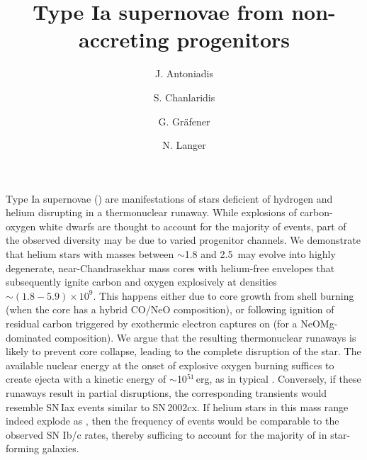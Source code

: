 \documentclass[twocolumn]{aa}
\begin{document}
\title{Type Ia supernovae from non-accreting progenitors}
 


   \author{J. Antoniadis 
   \and S. Chanlaridis 
   \and G. Gr\"{a}fener
   \and N. Langer
          }







\abstract 
{Type Ia supernovae (\ias) are  manifestations of  stars deficient of hydrogen and helium disrupting in a 
thermonuclear runaway. While explosions of carbon-oxygen white dwarfs are 
thought to account for the majority of events, part of the observed diversity 
may be due to varied progenitor channels. We demonstrate that 
helium stars with masses between $\sim$1.8 and 2.5\msun\ may evolve 
into highly degenerate, near-Chandrasekhar mass cores with 
helium-free envelopes that subsequently  ignite carbon and oxygen explosively at densities $\sim(1.8-5.9)\times 10^{9}$\denu. This happens either due to core growth from 
shell burning (when the core has a hybrid CO/NeO composition), 
or following ignition of residual carbon triggered by  
exothermic electron captures on  (for a 
NeOMg-dominated  composition).
 We argue that the resulting 
thermonuclear runaways is likely to prevent core collapse, leading to the complete disruption of the star.
 The available nuclear energy at the onset of 
 explosive oxygen burning suffices to create 
 ejecta with a kinetic energy of $\sim$10$^{51}$\,erg, as in typical \ias. 
  Conversely, if these  runaways  result in partial disruptions, the corresponding transients would resemble  
 SN\,Iax events similar to SN\,2002cx. 
If helium stars in this mass range indeed explode as \ias, then the frequency of events would be comparable to the observed SN Ib/c rates, thereby sufficing to account for the majority of \ias in star-forming galaxies.}



\maketitle
\end{document}
